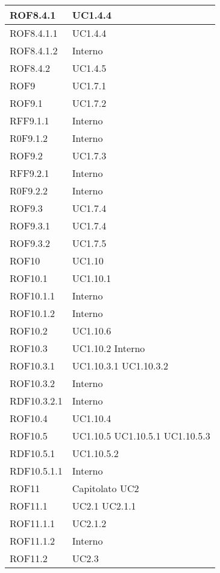 \begin{center}
\begin{longtable}{| p{4cm} | p{4cm} |}
\hline
ROF8.4.1   &  UC1.4.4  \\
\hline
ROF8.4.1.1   &  UC1.4.4  \\
\hline
ROF8.4.1.2   &  Interno  \\
\hline
ROF8.4.2   &  UC1.4.5  \\
\hline
ROF9   &  UC1.7.1 \\
\hline
ROF9.1   &  UC1.7.2 \\
\hline
RFF9.1.1   &  Interno \\
\hline
R0F9.1.2   &  Interno \\
\hline
ROF9.2   &  UC1.7.3 \\
\hline
RFF9.2.1   &  Interno \\
\hline
R0F9.2.2   &  Interno \\
\hline
ROF9.3   &  UC1.7.4 \\
\hline
ROF9.3.1   &  UC1.7.4 \\
\hline
ROF9.3.2   &  UC1.7.5 \\
\hline
ROF10   &  UC1.10 \\
\hline
ROF10.1   &  UC1.10.1 \\
\hline
ROF10.1.1   &  Interno \\
\hline
ROF10.1.2   &  Interno \\
\hline
ROF10.2   &  UC1.10.6 \\
\hline
ROF10.3   &  UC1.10.2 \newline Interno \\
\hline
ROF10.3.1   &  UC1.10.3.1 \newline UC1.10.3.2 \\
\hline
ROF10.3.2   &  Interno \\
\hline
RDF10.3.2.1   &  Interno \\
\hline
ROF10.4   &  UC1.10.4 \\
\hline
ROF10.5   &  UC1.10.5 \newline UC1.10.5.1 \newline UC1.10.5.3 \\
\hline
RDF10.5.1   &  UC1.10.5.2 \\
\hline
RDF10.5.1.1   &  Interno \\
\hline
ROF11   &  Capitolato \newline UC2 \\
\hline
ROF11.1   &  UC2.1 \newline UC2.1.1 \\
\hline
ROF11.1.1   &  UC2.1.2 \\
\hline
ROF11.1.2   &  Interno \\
\hline
ROF11.2   &  UC2.3  \\

\end{longtable}
\end{center}
